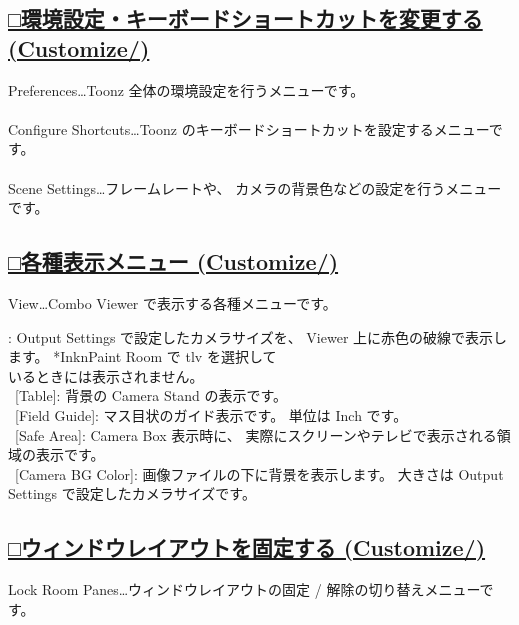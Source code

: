 \documentclass[a4paper,10pt]{article}
\begin{document}
\subsection*{\uline{□環境設定・キーボードショートカットを変更する (Customize/)}}

\normalsize
\noindent Preferences…Toonz 全体の環境設定を行うメニューです。\\
\\
Configure Shortcuts…Toonz のキーボードショートカットを設定するメニューです。\\
\\
Scene Settings…フレームレートや、 カメラの背景色などの設定を行うメニューです。\\

\subsection*{\uline{□各種表示メニュー (Customize/)}}

\normalsize
\noindent View…Combo Viewer で表示する各種メニューです。\par
\footnotesize
{}: Output Settings で設定したカメラサイズを、 Viewer 上に赤色の破線で表示します。 *InknPaint Room で tlv を選択して\\
いるときには表示されません。\\
\ [Table]: 背景の Camera Stand の表示です。\\
\ [Field Guide]: マス目状のガイド表示です。 単位は Inch です。\\
\ [Safe Area]: Camera Box 表示時に、 実際にスクリーンやテレビで表示される領域の表示です。\\
\ [Camera BG Color]: 画像ファイルの下に背景を表示します。 大きさは Output Settings で設定したカメラサイズです。\\

\subsection*{\uline{□ウィンドウレイアウトを固定する (Customize/)}}

\normalsize
\noindent Lock Room Panes…ウィンドウレイアウトの固定 / 解除の切り替えメニューです。
\end{document}
